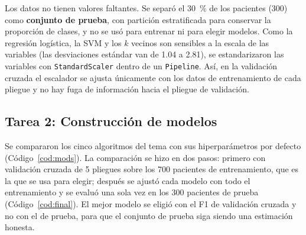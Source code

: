 \documentclass[11pt,letterpaper]{article}
\begin{document}
Los datos no tienen valores faltantes. Se separó el 30~\% de los pacientes (300) como \textbf{conjunto de prueba}, con partición estratificada para conservar la proporción de clases, y no se usó para entrenar ni para elegir modelos. Como la regresión logística, la SVM y los $k$ vecinos son sensibles a la escala de las variables (las desviaciones estándar van de 1.04 a 2.81), se estandarizaron las variables con \texttt{StandardScaler} dentro de un \texttt{Pipeline}. Así, en la validación cruzada el escalador se ajusta únicamente con los datos de entrenamiento de cada pliegue y no hay fuga de información hacia el pliegue de validación.


\subsection{Tarea 2: Construcción de modelos}

Se compararon los cinco algoritmos del tema con sus hiperparámetros por defecto (Código~\ref{cod:mods}). La comparación se hizo en dos pasos: primero con validación cruzada de 5 pliegues sobre los 700 pacientes de entrenamiento, que es la que se usa para elegir; después se ajustó cada modelo con todo el entrenamiento y se evaluó una sola vez en los 300 pacientes de prueba (Código~\ref{cod:final}). El mejor modelo se eligió con el F1 de validación cruzada y no con el de prueba, para que el conjunto de prueba siga siendo una estimación honesta.
\end{document}
